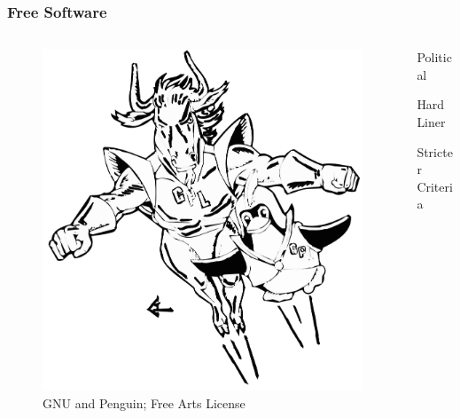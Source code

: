 \documentclass{beamer}
\begin{document}
\begin{frame}
  \frametitle{Free Software}
  \begin{columns}
    \begin{column}{0.6\textwidth}
      \begin{figure}
        \includegraphics[scale=0.3]{./img/gnu_penguin.png}
        \caption
          {GNU and Penguin; Free Arts License}
      \end{figure}
    \end{column}
    \begin{column}{0.4\textwidth}
      \Large
      Political

      Hard Liner

      Stricter Criteria
    \end{column}
  \end{columns}
\end{frame}
\end{document}
